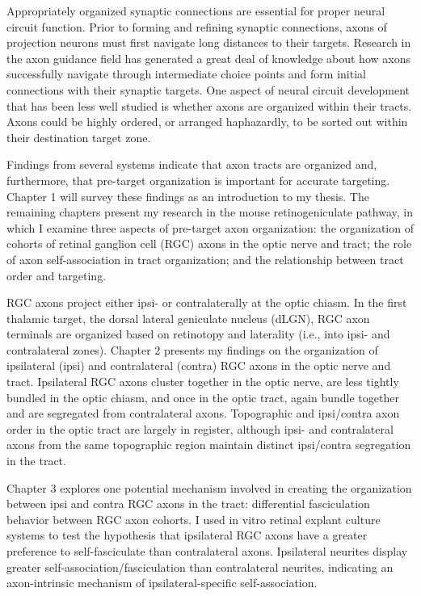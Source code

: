 Appropriately organized synaptic connections are essential for proper neural circuit function.
Prior to forming and refining synaptic connections, axons of projection neurons must first navigate long distances to their targets.
Research in the axon guidance field has generated a great deal of knowledge about how axons successfully navigate through intermediate choice points and form initial connections with their synaptic targets.
One aspect of neural circuit development that has been less well studied is whether axons are organized within their tracts.
Axons could be highly ordered, or arranged haphazardly, to be sorted out within their destination target zone.

Findings from several systems indicate that axon tracts are organized and, furthermore, that pre-target organization is important for accurate targeting.
Chapter 1 will survey these findings as an introduction to my thesis.
The remaining chapters present my research in the mouse retinogeniculate pathway, in which I examine three aspects of pre-target axon organization: the organization of cohorts of retinal ganglion cell (RGC) axons in the optic nerve and tract; the role of axon self-association in tract organization; and the relationship between tract order and targeting.

RGC axons project either ipsi- or contralaterally at the optic chiasm.
In the first thalamic target, the dorsal lateral geniculate nucleus (dLGN), RGC axon terminals are organized based on retinotopy and laterality (i.e., into ipsi- and contralateral zones).
Chapter 2 presents my findings on the organization of ipsilateral (ipsi) and contralateral (contra) RGC axons in the optic nerve and tract.
Ipsilateral RGC axons cluster together in the optic nerve, are less tightly bundled in the optic chiasm, and once in the optic tract, again bundle together and are segregated from contralateral axons.
Topographic and ipsi/contra axon order in the optic tract are largely in register, although ipsi- and contralateral axons from the same topographic region maintain distinct ipsi/contra segregation in the tract.

Chapter 3 explores one potential mechanism involved in creating the organization between ipsi and contra RGC axons in the tract: differential fasciculation behavior between RGC axon cohorts.
I used in vitro retinal explant culture systems to test the hypothesis that ipsilateral RGC axons have a greater preference to self-fasciculate than contralateral axons.
Ipsilateral neurites display greater self-association/fasciculation than contralateral neurites, indicating an axon-intrinsic mechanism of ipsilateral-specific self-association. 

